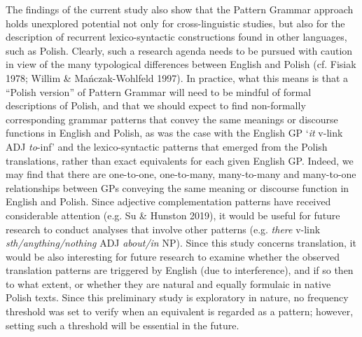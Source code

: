 \documentclass[12pt]{article}
\newenvironment{styleQuote}{\setlength\leftskip{0.3937in}\setlength\rightskip{0.3937in plus 1fil}\setlength\parindent{0in}\setlength\parfillskip{0pt plus 1fil}\setlength\parskip{0in plus 1pt}\writerlistparindent\writerlistleftskip\leavevmode\normalfont\normalsize\writerlistlabel\ignorespaces}{\unskip\vspace{0.1965in plus 0.019650001in}\par}
\newcommand\writerlistleftskip{}
\newcommand\writerlistparindent{}
\newcommand\writerlistlabel{}
\begin{document}
\begin{styleQuote}
The findings of the current study also show that the Pattern Grammar approach holds unexplored potential not only for cross-linguistic studies, but also for the description of recurrent lexico-syntactic constructions found in other languages, such as Polish. Clearly, such a research agenda needs to be pursued with caution in view of the many typological differences between English and Polish (cf. Fisiak 1978; Willim \& Mańczak-Wohlfeld 1997). In practice, what this means is that a “Polish version” of Pattern Grammar will need to be mindful of formal descriptions of Polish, and that we should expect to find non-formally corresponding grammar patterns that convey the same meanings or discourse functions in English and Polish, as was the case with the English GP ‘\textit{it} v-link ADJ \textit{to}{}-inf’ and the lexico-syntactic patterns that emerged from the Polish translations, rather than exact equivalents for each given English GP. Indeed, we may find that there are one-to-one, one-to-many, many-to-many and many-to-one relationships between GPs conveying the same meaning or discourse function in English and Polish. Since adjective complementation patterns have received considerable attention (e.g. Su \& Hunston 2019), it would be useful for future research to conduct analyses that involve other patterns (e.g. \textit{there} v-link \textit{sth/anything/nothing} ADJ \textit{about/in} NP). Since this study concerns translation, it would be also interesting for future research to examine whether the observed translation patterns are triggered by English (due to interference), and if so then to what extent, or whether they are natural and equally formulaic in native Polish texts. Since this preliminary study is exploratory in nature, no frequency threshold was set to verify when an equivalent is regarded as a pattern; however, setting such a threshold will be essential in the future. 
\end{styleQuote}
\end{document}
